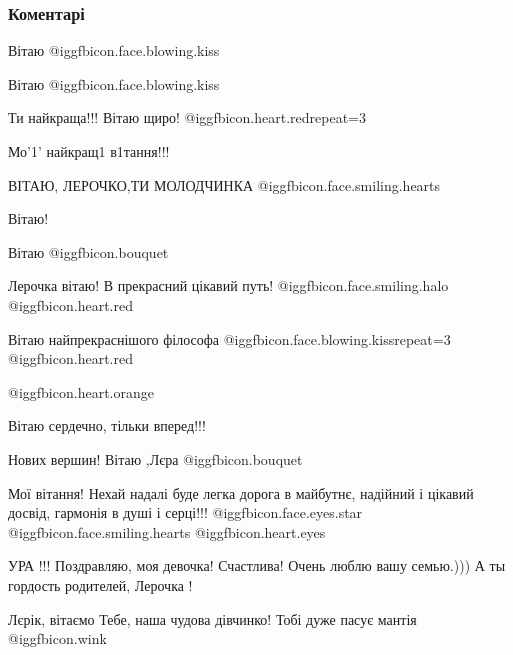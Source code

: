  
 
 
 
 
\subsubsection{Коментарі}

\begin{itemize} %
Вітаю @igg{fbicon.face.blowing.kiss} 

Вітаю @igg{fbicon.face.blowing.kiss} 

Ти найкраща!!! Вітаю щиро! @igg{fbicon.heart.red}{repeat=3}

Мо'1' найкращ1 в1тання!!!

ВІТАЮ, ЛЕРОЧКО,ТИ МОЛОДЧИНКА  @igg{fbicon.face.smiling.hearts} 

Вітаю!

Вітаю @igg{fbicon.bouquet} 

Лерочка вітаю! В прекрасний цікавий путь! @igg{fbicon.face.smiling.halo} @igg{fbicon.heart.red}

Вітаю найпрекраснішого філософа  @igg{fbicon.face.blowing.kiss}{repeat=3} @igg{fbicon.heart.red}

 @igg{fbicon.heart.orange} 

Вітаю сердечно, тільки вперед!!!

Нових вершин!
Вітаю ,Лєра @igg{fbicon.bouquet} 

Мої вітання! Нехай надалі буде легка дорога в майбутнє, надійний і цікавий досвід, гармонія в душі і серці!!! @igg{fbicon.face.eyes.star}  @igg{fbicon.face.smiling.hearts}  @igg{fbicon.heart.eyes} 

УРА !!! Поздравляю, моя девочка! Счастлива! Очень люблю вашу семью.))) А ты гордость родителей, Лерочка !

Лєрік, вітаємо Тебе, наша чудова дівчинко!
Тобі дуже пасує мантія  @igg{fbicon.wink} 


\end{itemize}
